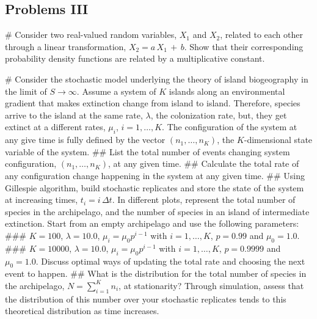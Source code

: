 \subsection*{Problems III} 

\begin{easylist}[enumerate]
# Consider two real-valued random variables, $X_1$ and $X_2$, related to each other through a linear transformation, $X_2 = a\,X_1\,+\,b$. Show that their corresponding probability density functions are related by a multiplicative constant.  

# Consider the stochastic model underlying the theory of island biogeography in the limit of  $S \rightarrow \infty$. Assume a system of $K$ islands along an environmental gradient that makes extinction change from island to island. Therefore, species arrive to the island at the same rate, $\lambda$, the colonization rate, but, they get extinct at a different rates, $\mu_i$, $i=1, \dots, K$. The configuration of the system at any give time is fully defined by the vector $(n_1, \dots, n_K)$, the $K$-dimensional state variable of the system.
## List the total number of events changing system configuration, $(n_1, \dots, n_K)$, at any given time. 
## Calculate the total rate of any configuration change happening in the system at any given time. 
## Using Gillespie algorithm, build stochastic replicates and store the state of the system at increasing times, $t_i= i\,\Delta t$. In different plots, represent the total number of species in the archipelago, and the number of species in an island of intermediate extinction. Start from an empty archipelago and use the following parameters:
### $K=100$, $\lambda = 10.0$, $\mu_i = \mu_0 p^{i-1}$ with $i=1, \dots, K$, $p = 0.99$ and $\mu_0 = 1.0$.
### $K=10000$, $\lambda = 10.0$, $\mu_i = \mu_0 p^{i-1}$ with $i=1, \dots, K$, $p = 0.9999$ and $\mu_0 = 1.0$. Discuss optimal ways of updating the total rate and choosing the next event to happen. 
## What is the distribution for the total number of species in the archipelago, $N = \sum_{i=1}^K n_i$, at stationarity? Through simulation, assess that the distribution of this number over your stochastic replicates tends to this theoretical distribution as time increases.  
\end{easylist}
